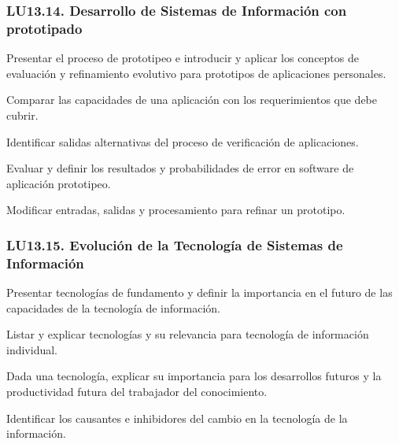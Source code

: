 \subsubsection{LU13.14. Desarrollo de Sistemas de Información con prototipado}\label{sec:LU13.14}
\begin{LearningUnit}
\begin{LUGoal}
\item Presentar el proceso de prototipeo e introducir y aplicar los conceptos de evaluación y refinamiento evolutivo para prototipos de aplicaciones personales.
\end{LUGoal}

\begin{LUObjective}
\item Comparar las capacidades de una aplicación con los requerimientos que debe cubrir.
\item Identificar salidas alternativas del proceso de verificación de aplicaciones.
\item Evaluar y definir los resultados y probabilidades de error en software de aplicación prototipeo.
\item Modificar entradas, salidas y procesamiento para refinar un prototipo.
\end{LUObjective}
\end{LearningUnit}

\subsubsection{LU13.15. Evolución de la Tecnología de Sistemas de Información}\label{sec:LU13.15}
\begin{LearningUnit}
\begin{LUGoal}
\item Presentar tecnologías de fundamento y definir la importancia en el futuro de las capacidades de la tecnología de información.
\end{LUGoal}

\begin{LUObjective}
\item Listar y explicar tecnologías y su relevancia para tecnología de información individual.
\item Dada una tecnología, explicar su importancia para los desarrollos futuros y la productividad futura del trabajador del conocimiento.
\item Identificar los causantes e inhibidores del cambio en la tecnología de la información.
\end{LUObjective}
\end{LearningUnit}


